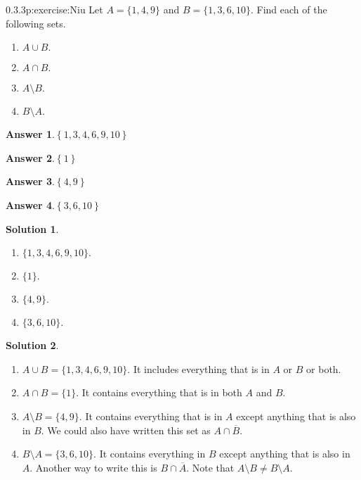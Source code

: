 \documentclass[twoside,11pt,]{book}
\newcommand{\blocktitlefont}{\relax}
\numberwithin{equation}{chapter}
\renewcommand{\bar}{\overline}
\begin{document}
\begin{divisionsolution}{0.3.3}{}{p:exercise:Niu}%
Let \(A = \{1, 4, 9\}\) and \(B = \{1, 3, 6, 10\}\text{.}\) Find each of the following sets.%
\begin{enumerate}[label=(\alph*)]
\item{}\(A \cup B\text{.}\)%
\item{}\(A \cap B\text{.}\)%
\item{}\(A \setminus B\text{.}\)%
\item{}\(B \setminus A\text{.}\)%
\end{enumerate}
%
\par\smallskip%
\noindent\textbf{\blocktitlefont Answer 1}.\quad{}\(\left\{1,3,4,6,9,10\right\}\)%
\par\smallskip%
\noindent\textbf{\blocktitlefont Answer 2}.\quad{}\(\left\{1\right\}\)%
\par\smallskip%
\noindent\textbf{\blocktitlefont Answer 3}.\quad{}\(\left\{4,9\right\}\)%
\par\smallskip%
\noindent\textbf{\blocktitlefont Answer 4}.\quad{}\(\left\{3,6,10\right\}\)%
\par\smallskip%
\noindent\textbf{\blocktitlefont Solution 1}.\quad{}%
\begin{enumerate}[label=(\alph*)]
\item{}\(\{1, 3, 4, 6, 9, 10\}\text{.}\)%
\item{}\(\{1\}\text{.}\)%
\item{}\(\{4,9\}\text{.}\)%
\item{}\(\{3, 6, 10\}\text{.}\)%
\end{enumerate}
%
\par\smallskip%
\noindent\textbf{\blocktitlefont Solution 2}.\quad{}%
\begin{enumerate}[label=(\alph*)]
\item{}\(A \cup B = \{1,3,4,6,9,10\}\text{.}\) It includes everything that is in \(A\) or \(B\) or both.%
\item{}\(A \cap B = \{1\}\text{.}\) It contains everything that is in both \(A\) and \(B\text{.}\)%
\item{}\(A \setminus B = \{4, 9\}\text{.}\) It contains everything that is in \(A\) except anything that is also in \(B\text{.}\) We could also have written this set as \(A \cap \bar{B}\text{.}\)%
\item{}\(B \setminus A = \{3, 6, 10\}\text{.}\) It contains everything in \(B\) except anything that is also in \(A\text{.}\) Another way to write this is \(B \cap \bar{A}\text{.}\) Note that \(A \setminus B \ne B \setminus A\text{.}\)%
\end{enumerate}
%
\end{divisionsolution}%
\end{document}
